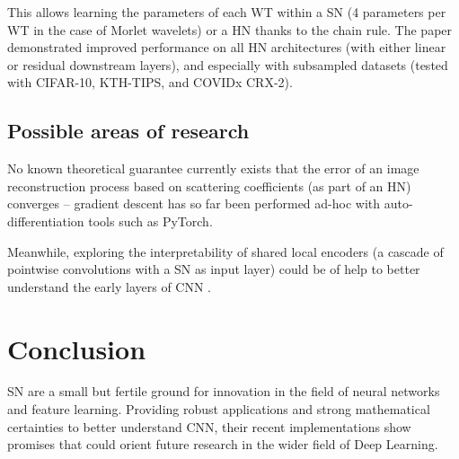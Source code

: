 \documentclass[runningheads]{llncs}
\begin{document}
This allows learning the parameters of each WT within a SN (4 parameters per WT in the case of Morlet wavelets) or a HN thanks to the chain rule. The paper\cite{parametric} demonstrated improved performance on all HN architectures (with either linear or residual downstream layers), and especially with subsampled datasets (tested with CIFAR-10, KTH-TIPS, and COVIDx CRX-2\cite{covid}).

\subsection{Possible areas of research}

No known theoretical guarantee currently exists that the error of an image reconstruction process based on scattering coefficients (as part of an HN) converges \cite{oyallon} -- gradient descent has so far been performed ad-hoc with auto-differentiation tools such as PyTorch\cite{paszke}. 

Meanwhile, exploring the interpretability of shared local encoders (a cascade of pointwise convolutions with a SN as input layer) could be of help to better understand the early layers of CNN \cite{oyallon}.

\section{Conclusion}

SN are a small but fertile ground for innovation in the field of neural networks and feature learning. Providing robust applications and strong mathematical certainties to better understand CNN, their recent implementations show promises that could orient future research in the wider field of Deep Learning.
\end{document}
